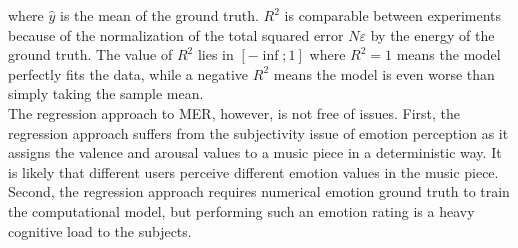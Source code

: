 where $\widehat{y}$ is the mean of the ground truth. $R^2$ is comparable between experiments because of the normalization of the total squared error $N\varepsilon$ by the energy of the ground truth. The value of $R^2$  lies in $[-\inf;1]$ where $R^2=1$ means the model perfectly fits the data, while a negative $R^2$ means the model is even worse than simply taking the sample mean.
\\ \indent
The regression approach to MER, however, is not free of issues. First, the regression approach suffers from the subjectivity issue of emotion perception as it assigns the valence and arousal values to a music piece in a deterministic way. It is likely that different users perceive different emotion values in the music piece. Second, the regression approach requires numerical emotion ground truth to train the computational model, but performing such an emotion rating is a heavy cognitive load to the subjects.